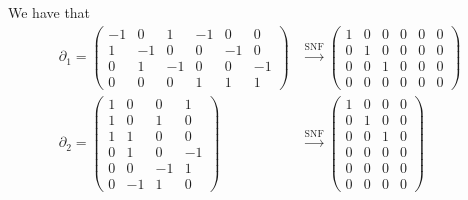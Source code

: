 \documentclass[11pt]{article}
\begin{document}
\begin{enumerate}
    We have that \begin{align*}
        \partial_1 = \begin{pmatrix}
            -1 & 0 & 1 & -1 & 0 & 0 \\
            1 & -1 & 0 & 0 & -1 & 0 \\
            0 & 1 & -1 & 0 & 0 & -1 \\
            0 & 0 & 0 & 1 & 1 &  1
        \end{pmatrix} &\overset{\text{SNF}}{\longrightarrow} \begin{pmatrix}
            1&	0&	0&	0&	0&	0\\
            0&	1&	0&	0&	0&	0\\
            0&	0&	1&	0&	0&	0\\
            0&	0&	0&	0&	0&	0
        \end{pmatrix} \\
        \partial_2 = \begin{pmatrix}
           1 & 0 & 0 & 1\\
           1 & 0 & 1 & 0\\
           1 & 1 & 0 & 0\\
           0 & 1 & 0 & -1\\
           0 & 0 & -1 & 1\\
           0 & -1 & 1 & 0
        \end{pmatrix} &\overset{\text{SNF}}{\longrightarrow} \begin{pmatrix}
            1&	0&	0&	0\\
            0&	1&	0&	0\\
            0&	0&	1&	0\\
            0&	0&	0&	0\\
            0&	0&	0&	0\\
            0&	0&	0&	0
        \end{pmatrix} 
    \end{align*}


\end{enumerate}
\end{document}
